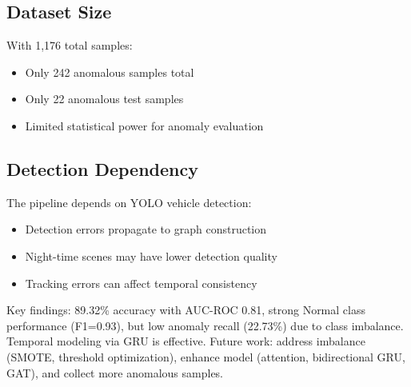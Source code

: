 \subsection{Dataset Size}

With 1,176 total samples:
\begin{itemize}
    \item Only 242 anomalous samples total
    \item Only 22 anomalous test samples
    \item Limited statistical power for anomaly evaluation
\end{itemize}

\subsection{Detection Dependency}

The pipeline depends on YOLO vehicle detection:
\begin{itemize}
    \item Detection errors propagate to graph construction
    \item Night-time scenes may have lower detection quality
    \item Tracking errors can affect temporal consistency
\end{itemize}

Key findings: 89.32\% accuracy with AUC-ROC 0.81, strong Normal class performance (F1=0.93), but low anomaly recall (22.73\%) due to class imbalance. Temporal modeling via GRU is effective. Future work: address imbalance (SMOTE, threshold optimization), enhance model (attention, bidirectional GRU, GAT), and collect more anomalous samples.
